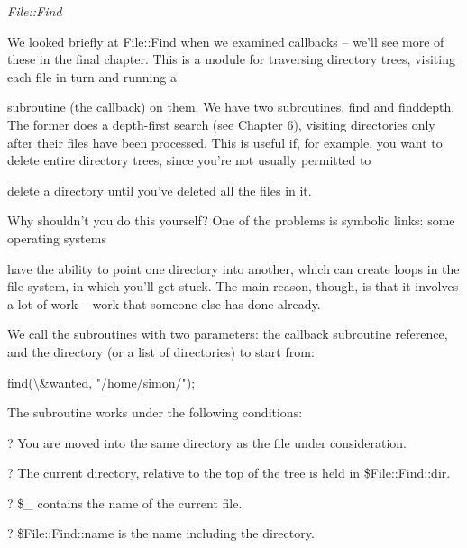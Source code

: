 \documentclass[a4paper,11pt]{book}
\begin{document}
\noindent 

\noindent \textit{File::Find}

\noindent We looked briefly at File::Find when we examined callbacks -- we'll see more of these in the final chapter. This   is a module for traversing directory trees, visiting each file in turn and running a

\noindent subroutine (the callback) on them. We have two subroutines, find and finddepth. The former does a depth-first search (see Chapter 6), visiting directories only after their files have been processed. This is useful if, for example, you want to delete entire directory trees, since you're not usually permitted to

\noindent delete a directory until you've deleted all the files in it.

\noindent 

\noindent 

\noindent Why shouldn't you do this yourself? One of the problems is symbolic links: some operating systems

\noindent have the ability to point one directory into another, which can create loops in the file system, in which you'll get stuck. The main reason, though, is that it involves a lot of work -- work that someone else has done already.

\noindent 

\noindent We call the subroutines with two parameters: the callback subroutine reference, and the directory (or a list of directories) to start from:

\noindent 

\noindent 

\noindent find(\textbackslash \&wanted, "/home/simon/");

\noindent 

\noindent The subroutine works under the following conditions:

\noindent 

\noindent ? You are moved into the same directory as the file under consideration.

\noindent 

\noindent ? The current directory, relative to the top of the tree is held in \$File::Find::dir.

\noindent 

\noindent ? \$\_ contains the name of the current file.

\noindent 

\noindent ? \$File::Find::name is the name including the directory.
\end{document}
